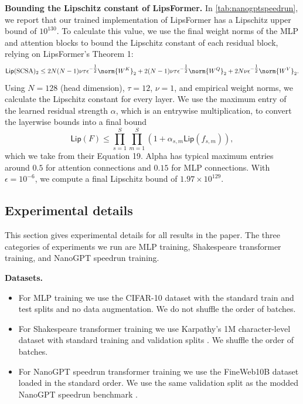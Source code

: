 \textbf{Bounding the Lipschitz constant of LipsFormer.} In \cref{tab:nanogptspeedrun}, we report that our trained implementation of LipsFormer has a Lipschitz upper bound of $10^{130}$. To calculate this value, we use the final weight norms of the MLP and attention blocks to bound the Lipschitz constant of each residual block, relying on LipsFormer's Theorem 1:
\[
    \mathsf{Lip}(\text{SCSA})_2 \leq 2N(N-1)\nu\tau\epsilon^{-\tfrac12}\norm{W^K}_2 + 2(N-1)\nu\tau\epsilon^{-\tfrac12}\norm{W^Q}_2 + 2N\nu\epsilon^{-\tfrac12}\norm{W^V}_2.
\]
Using $N = 128$ (head dimension), $\tau = 12$, $\nu = 1$, and empirical weight norms, we calculate the Lipschitz constant for every layer. We use the maximum entry of the learned residual strength $\alpha$, which is an entrywise multiplication, to convert the layerwise bounds into a final bound \[
    \mathsf{Lip}(F) \leq \prod_{s=1}^S \prod_{m=1}^S (1 + \alpha_{s,m} \mathsf{Lip}(f_{s,m})),
\] which we take from their Equation 19. Alpha has typical maximum entries around $0.5$ for attention connections and $0.15$ for MLP connections. With $\epsilon = 10^{-6}$, we compute a final Lipschitz bound of $1.97 \times 10^{129}$.


\subsection{Experimental details}
\label{app:experimental-details}

This section gives experimental details for all results in the paper. The three categories of experiments we run are MLP training, Shakespeare transformer training, and NanoGPT speedrun training.

\textbf{Datasets.}
\begin{itemize}
    \item For MLP training we use the CIFAR-10 dataset \cite{krizhevsky2009cifar} with the standard train and test splits and no data augmentation. We do not shuffle the order of batches.
    \item For Shakespeare transformer training we use Karpathy's 1M character-level dataset with standard training and validation splits \citep{karpathy_nanoGPT}. We shuffle the order of batches.
    \item For NanoGPT speedrun transformer training we use the FineWeb10B dataset \citep{penedo2024finewebdatasetsdecantingweb} loaded in the standard order. We use the same validation split as the modded NanoGPT speedrun benchmark \citep{modded_nanogpt_2024}.
\end{itemize}

